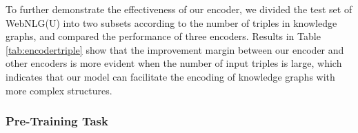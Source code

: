 \documentclass[11pt,a4paper]{article}
\begin{document}
\begin{table} [!htp]
\centering
\small
{}
\caption{BLEU scores of three encoders on the test set of WebNLG(U) with different numbers of input triples.}
\label{tab:encodertriple}
\end{table}


To further demonstrate the effectiveness of our encoder,
we divided the test set of WebNLG(U) into two subsets according to the number of triples in knowledge graphs, and compared the performance of three encoders. Results in Table \ref{tab:encodertriple} show that the improvement margin between our encoder and other encoders is more evident when the number of input triples is large, which indicates that our model can facilitate the encoding of knowledge graphs with more complex structures.















\subsubsection{Pre-Training Task}
\label{sec:ablationtask}

\begin{table} [!h]
\centering
\small
{}
\caption{Ablation test of three pre-training tasks on WebNLG(U), including text / graph reconstruction and graph-text alignments via OT. BARTPretrain / KGPTPretrain means using the pre-training tasks of BART / KGPT instead of our tasks on KGTEXT. }
\label{tab:ablationtask}
\end{table}
\end{document}
